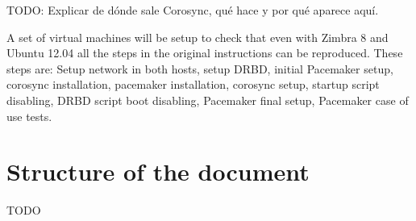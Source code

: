 TODO: Explicar de d\'onde sale Corosync, qu\'e hace y por qu\'e aparece aqu\'i.

A set of virtual machines will be setup to check that even with Zimbra 8 and Ubuntu 12.04 all the steps in the original instructions can be reproduced. These steps are: Setup network in both hosts, setup DRBD, initial Pacemaker setup, corosync installation, pacemaker installation, corosync setup, startup script disabling, DRBD script boot disabling, Pacemaker final setup, Pacemaker case of use tests.

\section {Structure of the document}
TODO


